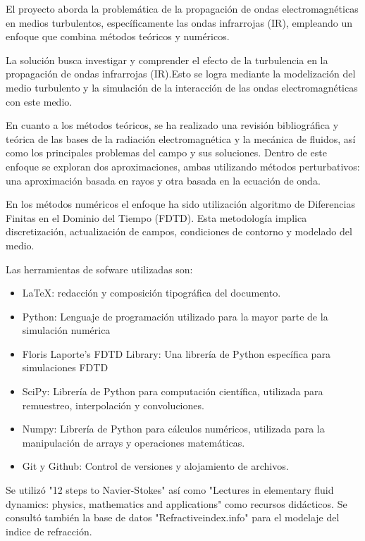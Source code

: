 El proyecto aborda la problemática de la propagación de ondas electromagnéticas en medios turbulentos, específicamente las ondas infrarrojas (IR), empleando un enfoque que combina métodos teóricos y numéricos.

La solución busca investigar y comprender el efecto de la turbulencia en la propagación de ondas infrarrojas (IR).Esto se logra mediante la modelización del medio turbulento y la simulación de la interacción de las ondas electromagnéticas con este medio.

En cuanto a los métodos teóricos, se ha realizado una revisión bibliográfica y teórica de las bases de la radiación electromagnética y la mecánica de fluidos, así como los principales problemas del campo y sus soluciones. Dentro de este enfoque se exploran dos aproximaciones, ambas utilizando métodos perturbativos: una aproximación basada en rayos y otra basada en la ecuación de onda.
    
En los métodos numéricos el enfoque ha sido utilización algoritmo de Diferencias Finitas en el Dominio del Tiempo (FDTD). Esta metodología implica discretización, actualización de campos, condiciones de contorno y modelado del medio.

Las herramientas de sofware utilizadas son:

\begin{itemize}
    \item \LaTeX: redacción y composición tipográfica del documento.
    \item Python: Lenguaje de programación utilizado para la mayor parte de la simulación numérica
    \item Floris Laporte's FDTD Library: Una librería de Python específica para simulaciones FDTD
    \item SciPy: Librería de Python para computación científica, utilizada para remuestreo, interpolación y convoluciones.
    \item Numpy: Librería de Python para cálculos numéricos, utilizada para la manipulación de arrays y operaciones matemáticas.
    \item Git y Github: Control de versiones y alojamiento de archivos.
\end{itemize}

Se utilizó "12 steps to Navier-Stokes" \cite{barba_cfd_2018} así como "Lectures in elementary fluid dynamics: physics, mathematics and applications" \cite{mcdonough_lectures_2009} como recursos didácticos. Se consultó también la base de datos "Refractiveindex.info" para el modelaje del indice de refracción.